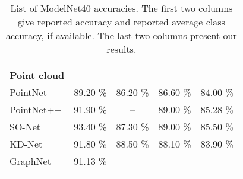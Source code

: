 \begin{table}[]
\begin{tabular}{lcccc}
		                     &                    &                         &                   &                         \\
		\textbf{Point cloud} &                    &                         &                   &                         \\
		PointNet             &      89.20 \%      &        86.20 \%         &     86.60 \%      &        84.00 \%         \\
		PointNet++           &      91.90 \%      &           --            &     89.00 \%      &        85.28 \%         \\
		SO-Net               &      93.40 \%      &        87.30 \%         &     89.00 \%      &        85.50 \%         \\
		KD-Net               &      91.80 \%      &        88.50 \%         &     88.10 \%      &        83.90 \%         \\
		GraphNet             &      91.13 \%      &           --            &        --         &           --            \\ \hline
		                     &                    &                         &                   &
	\end{tabular}
\caption{List of ModelNet40 accuracies. The first two columns give reported accuracy and reported average class accuracy, if available. The last two columns present our results.}
\label{Table:accs}
\end{table}